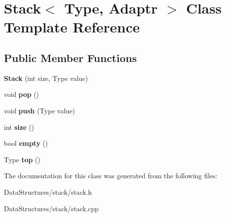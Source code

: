 \hypertarget{classStack}{}\section{Stack$<$ Type, Adaptr $>$ Class Template Reference}
\label{classStack}
\subsection*{Public Member Functions}
\begin{DoxyCompactItemize}
\item 
\mbox{\label{classStack_ac7626c1ff69eb21628cb9ad998ce08ba}} 
{\bfseries Stack} (int size, Type value)
\item 
\mbox{\label{classStack_acbcdcf56bba1e729dbed6deec6c74092}} 
void {\bfseries pop} ()
\item 
\mbox{\label{classStack_ac715ade76f10bc94c2e9f7b532597efd}} 
void {\bfseries push} (Type value)
\item 
\mbox{\label{classStack_a173d14ffc72c30d0b736cbda595e4326}} 
int {\bfseries size} ()
\item 
\mbox{\label{classStack_a756ca38398e41f6eb7e924c895ed9338}} 
bool {\bfseries empty} ()
\item 
\mbox{\label{classStack_a4ec6a7947857564e39ed4bd62392fb3a}} 
Type {\bfseries top} ()
\end{DoxyCompactItemize}


The documentation for this class was generated from the following files\+:\begin{DoxyCompactItemize}
\item 
Data\+Structures/stack/stack.\+h\item 
Data\+Structures/stack/stack.\+cpp\end{DoxyCompactItemize}
